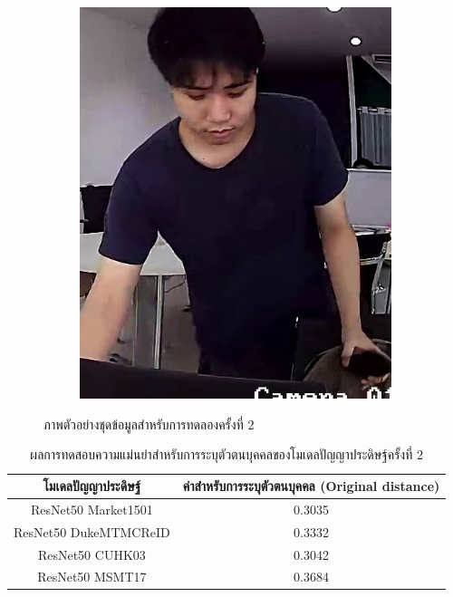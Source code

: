 \begin{figure}[!ht]
\begin{subfigure}[b]{0.2\textwidth}
        \includegraphics[width=\textwidth]{chapter4/images/first_1.jpg}
        \label{fig:ex_4}
    \end{subfigure}
    \caption{ภาพตัวอย่างชุดข้อมูลสำหรับการทดลองครั้งที่ 2}
    \label{fig: ภาพตัวอย่างชุดข้อมูลสำหรับการทดลอง 2}
\end{figure}
\begin{table}[!ht]
    \centering
    \begin{tabular}{|c|c|}
            \hline
            {โมเดลปัญญาประดิษฐ์}&{ค่าสำหรับการระบุตัวตนบุคคล (Original distance)}							\\
            \hline
            ResNet50 Market1501	 			& 0.3035								\\
            ResNet50 DukeMTMCReID			& 0.3332								\\
            ResNet50 CUHK03				& 0.3042								\\
            ResNet50 MSMT17				& 0.3684								\\
        \hline
    \end{tabular}
    \caption{ผลการทดสอบความแม่นยำสำหรับการระบุตัวตนบุคคลของโมเดลปัญญาประดิษฐ์ครั้งที่ 2}
    \label{tab: Original distant of image 2}    
\end{table}

